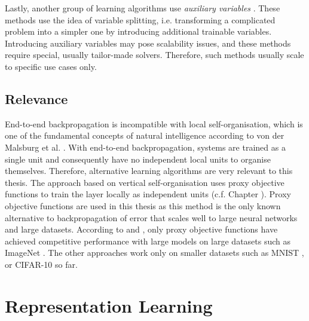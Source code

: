 Lastly, another group of learning algorithms use \emph{auxiliary variables} .
These methods use the idea of variable splitting, i.e. transforming a complicated problem into a simpler one by introducing additional trainable variables.
Introducing auxiliary variables may pose scalability issues, and these methods require special, usually tailor-made solvers.
Therefore, such methods usually scale to specific use cases only.

\subsection{Relevance}
End-to-end backpropagation is incompatible with local self-organisation, which is one of the fundamental concepts of natural intelligence according to von der Malsburg et al. .
With end-to-end backpropagation, systems are trained as a single unit and consequently have no independent local units to organise themselves.
Therefore, alternative learning algorithms are very relevant to this thesis.
The approach based on vertical self-organisation uses proxy objective functions to train the layer locally as independent units (c.f. Chapter ).
Proxy objective functions are used in this thesis as this method is the only known alternative to backpropagation of error that scales well to large neural networks and large datasets.
According to  and , only proxy objective functions have achieved competitive performance with large models on large datasets such as ImageNet .
The other approaches work only on smaller datasets such as MNIST \cite{Lecun_Bottou_Bengio_Haffner_1998}, or CIFAR-10 \cite{cifar_10} so far.

\section{Representation Learning}

